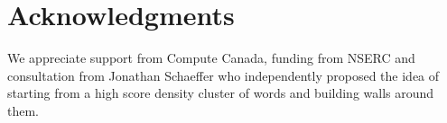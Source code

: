 \section{Acknowledgments}

We appreciate support from Compute Canada, funding from NSERC and consultation from Jonathan Schaeffer who independently proposed the idea of starting from a high score density cluster of words and building walls around them.
